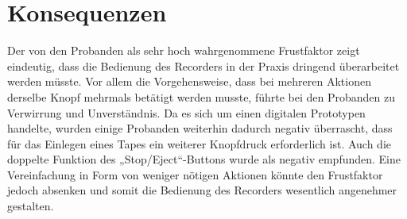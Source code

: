 \section{Konsequenzen}

Der von den Probanden als sehr hoch wahrgenommene Frustfaktor zeigt eindeutig, dass die Bedienung des Recorders in der Praxis dringend überarbeitet werden müsste. Vor allem die Vorgehensweise, dass bei mehreren Aktionen derselbe Knopf mehrmals betätigt werden musste, führte bei den Probanden zu Verwirrung und Unverständnis. Da es sich um einen digitalen Prototypen handelte, wurden einige Probanden weiterhin dadurch negativ überrascht, dass für das Einlegen eines Tapes ein weiterer Knopfdruck erforderlich ist. Auch die doppelte Funktion des „Stop/Eject“-Buttons wurde als negativ empfunden.
Eine Vereinfachung in Form von weniger nötigen Aktionen könnte den Frustfaktor jedoch absenken und somit die Bedienung des Recorders wesentlich angenehmer gestalten.